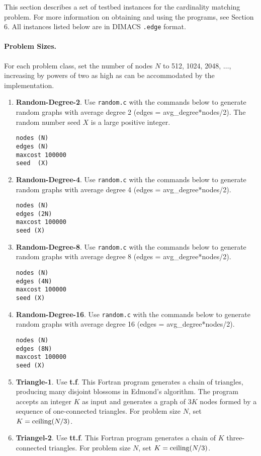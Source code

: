 This section describes a set of testbed instances for the 
cardinality matching problem.  For more information on obtaining
and using the programs, see Section 6.  All instances listed 
below are in DIMACS {\tt .edge} format. 

\paragraph{Problem Sizes.}  For each problem class, set the
number of nodes $N$ to 512, 1024, 2048, $\ldots$, increasing by 
powers of two as high as can be accommodated by the implementation. 

\begin{enumerate}
\item {\bf Random-Degree-2}.  Use {\tt random.c} with the commands
below to generate random graphs with average degree 2 
(edges = avg\_degree*nodes/2).  The random number seed $X$ is a large
positive integer. 
\begin{verbatim} 
nodes (N)
edges (N)
maxcost 100000
seed  (X) 
\end{verbatim}

\item {\bf Random-Degree-4}.
Use {\tt random.c} with the commands
below to generate random graphs with average degree 4
(edges = avg\_degree*nodes/2).  
\begin{verbatim} 
nodes (N)
edges (2N)
maxcost 100000
seed (X)
\end{verbatim}

\item {\bf Random-Degree-8}.  Use {\tt random.c} with the commands
below to generate random graphs with average degree 8
(edges = avg\_degree*nodes/2).  
\begin{verbatim} 
nodes (N)
edges (4N)
maxcost 100000
seed (X)
\end{verbatim}

\item {\bf Random-Degree-16}. 
Use {\tt random.c} with the commands
below to generate random graphs with average degree 16
(edges = avg\_degree*nodes/2).  
\begin{verbatim} 
nodes (N)
edges (8N)
maxcost 100000
seed (X)
\end{verbatim}

\item {\bf Triangle-1}.  Use {\bf t.f}.  This Fortran program
generates a chain of triangles, producing many disjoint blossoms 
in Edmond's algorithm.  The program accepts an integer $K$ 
as input and generates a graph of $3K$ nodes formed
by a sequence of one-connected triangles.  For problem size $N$, set
$K = {\rm ceiling}(N/3)$.  

\item {\bf Triangel-2}.  Use {\bf tt.f}.  This Fortran
program generates a chain of $K$ three-connected triangles.  
For problem size $N$, set $K = {\rm ceiling} (N/3)$. 

\end{enumerate} 

